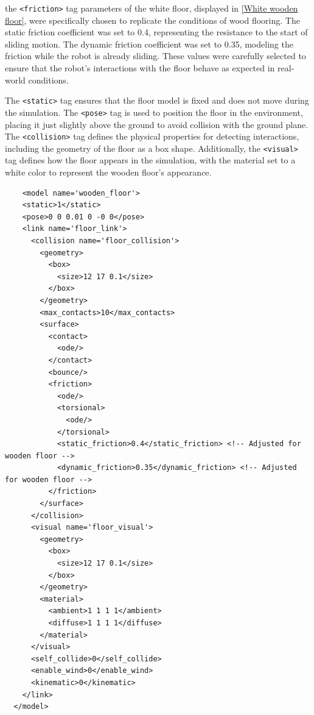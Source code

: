 \documentclass[../../main]{subfiles}
\begin{document}
    the \texttt{<friction>} tag parameters of the white floor, displayed in \cref{White wooden floor}, 
were specifically chosen to replicate the conditions of wood flooring. 
The static friction coefficient was set to 0.4, representing the 
resistance to the start of sliding motion. The dynamic friction coefficient was set 
to 0.35, modeling the friction while the robot is already sliding. These values were 
carefully selected to ensure that the robot's interactions with the floor behave as 
expected in real-world conditions.

The \texttt{<static>} tag ensures that the floor model is fixed and does not move 
during the simulation. The \texttt{<pose>} tag is used to position the floor in the 
environment, placing it just slightly above the ground to avoid collision with the 
ground plane. The \texttt{<collision>} tag defines the physical properties for 
detecting interactions, including the geometry of the floor as a box shape. 
Additionally, the \texttt{<visual>} tag defines how the floor appears in the simulation, 
with the material set to a white color to represent the wooden floor's appearance. 

\newpage
\begin{codebox}[]{}
  
  \begin{verbatim}
    <model name='wooden_floor'>
    <static>1</static>
    <pose>0 0 0.01 0 -0 0</pose>
    <link name='floor_link'>
      <collision name='floor_collision'>
        <geometry>
          <box>
            <size>12 17 0.1</size>
          </box>
        </geometry>
        <max_contacts>10</max_contacts>
        <surface>
          <contact>
            <ode/>
          </contact>
          <bounce/>
          <friction>
            <ode/>
            <torsional>
              <ode/>
            </torsional>
            <static_friction>0.4</static_friction> <!-- Adjusted for wooden floor -->
            <dynamic_friction>0.35</dynamic_friction> <!-- Adjusted for wooden floor -->
          </friction>
        </surface>
      </collision>
      <visual name='floor_visual'>
        <geometry>
          <box>
            <size>12 17 0.1</size>
          </box>
        </geometry>
        <material>
          <ambient>1 1 1 1</ambient>
          <diffuse>1 1 1 1</diffuse>
        </material>
      </visual>
      <self_collide>0</self_collide>
      <enable_wind>0</enable_wind>
      <kinematic>0</kinematic>
    </link>
  </model>
\end{verbatim}
\end{codebox}
\end{document}
